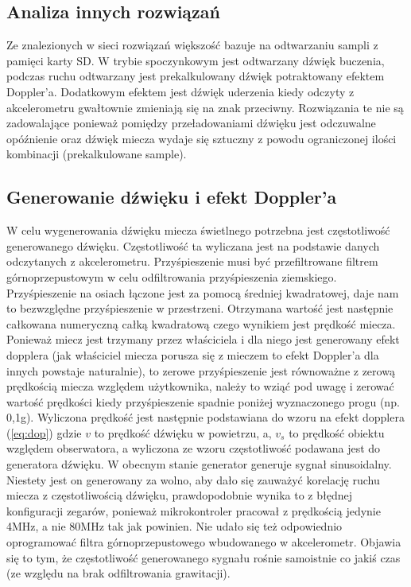 \documentclass[10pt, a4paper]{article}
\begin{document}
\subsection{Analiza innych rozwiązań}
Ze znalezionych w sieci rozwiązań większość bazuje na odtwarzaniu sampli z pamięci karty SD. W trybie spoczynkowym jest odtwarzany dźwięk buczenia, podczas ruchu odtwarzany jest prekalkulowany dźwięk potraktowany efektem Doppler'a. Dodatkowym efektem jest dźwięk uderzenia kiedy odczyty z akcelerometru gwałtownie zmieniają się na znak przeciwny. Rozwiązania te nie są zadowalające ponieważ pomiędzy przeładowaniami dźwięku jest odczuwalne opóźnienie oraz dźwięk miecza wydaje się sztuczny z powodu ograniczonej ilości kombinacji (prekalkulowane sample).
\subsection{Generowanie dźwięku i efekt Doppler'a}
 W celu wygenerowania dźwięku miecza świetlnego potrzebna jest częstotliwość generowanego dźwięku. Częstotliwość ta wyliczana jest na podstawie danych odczytanych z akcelerometru. Przyśpieszenie musi być przefiltrowane filtrem górnoprzepustowym w celu odfiltrowania przyśpieszenia ziemskiego. Przyśpieszenie na osiach łączone jest za pomocą średniej kwadratowej, daje nam to bezwzględne przyśpieszenie w przestrzeni. Otrzymana wartość jest następnie całkowana numeryczną całką kwadratową czego wynikiem jest prędkość miecza. Ponieważ miecz jest trzymany przez właściciela i dla niego jest generowany efekt dopplera (jak właściciel miecza porusza się z mieczem to efekt Doppler'a dla innych powstaje naturalnie), to zerowe przyśpieszenie jest równoważne z zerową prędkością miecza względem użytkownika, należy to wziąć pod uwagę i zerować wartość prędkości kiedy przyśpieszenie spadnie poniżej wyznaczonego progu (np. 0,1g). Wyliczona prędkość jest następnie podstawiana do wzoru na efekt dopplera (\ref{eq:dop}) gdzie $v$ to prędkość dźwięku w powietrzu, a, $v_{s}$ to prędkość obiektu względem obserwatora, a wyliczona ze wzoru częstotliwość podawana jest do generatora dźwięku. W obecnym stanie generator generuje sygnał sinusoidalny. Niestety jest on generowany za wolno, aby dało się zauważyć korelację ruchu miecza z częstotliwością dźwięku, prawdopodobnie wynika to z błędnej konfiguracji zegarów, ponieważ mikrokontroler pracował z prędkością jedynie 4MHz, a nie 80MHz tak jak powinien. Nie udało się też odpowiednio oprogramować filtra górnoprzepustowego wbudowanego w akcelerometr. Objawia się to tym, że częstotliwość generowanego sygnału rośnie samoistnie co jakiś czas (ze względu na brak odfiltrowania grawitacji). 
 
\end{document}
